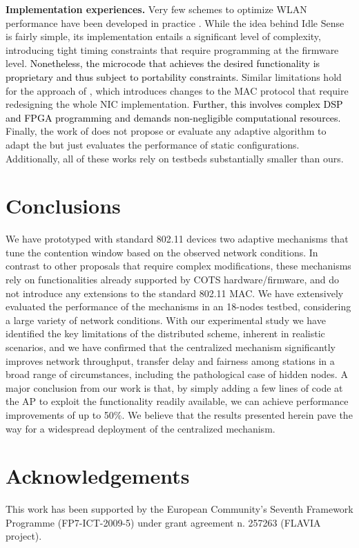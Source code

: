 \documentclass[a4paper,10pt]{article}
\newcommand{\revs}[1]{\textcolor{black}{#1}}
\begin{document}
\vspace{0.5em}
{\bf Implementation experiences.} Very few schemes to optimize WLAN performance have been developed in practice \cite{siris06,AOBimpl,idle07}. While the idea behind Idle Sense \cite{heusse05} is fairly simple, its implementation \cite{idle07} entails a significant level of complexity, introducing tight timing constraints that require programming at the firmware level. \revs{Nonetheless, the microcode that achieves the desired functionality is proprietary and thus subject to portability constraints.} Similar limitations hold for the approach of \cite{AOBimpl}, which introduces changes to the MAC protocol that require redesigning the whole NIC implementation. \revs{Further, this involves complex DSP and FPGA programming and demands non-negligible computational resources.} Finally, the work of \cite{siris06} does not propose or evaluate any adaptive algorithm to adapt the  but just evaluates the performance of static configurations. Additionally, all of these works rely on testbeds substantially smaller than ours. 














\section{Conclusions}
\label{sec:conclusions}

We have prototyped with standard 802.11 devices two adaptive mechanisms that tune the contention window based on the observed network conditions. In contrast to other proposals that require complex modifications, these mechanisms rely on functionalities already supported by COTS hardware/firmware, and do not introduce any extensions to the standard 802.11 MAC. We have extensively evaluated the performance of the mechanisms in an 18-nodes testbed, considering a large variety of network conditions. With our experimental study we have identified the key limitations of the distributed scheme, inherent in realistic scenarios, and we have confirmed that the centralized mechanism significantly improves network throughput, transfer delay and fairness among stations in a broad range of circumstances, including the pathological case of hidden nodes. A major conclusion from our work is that, by simply adding a few lines of code at the AP to exploit the functionality readily available, we can achieve performance improvements of up to 50\%. We believe that the results presented herein pave the way for a widespread deployment of the centralized mechanism.

\section*{Acknowledgements}

This work has been supported by the European Community's Seventh Framework Programme (FP7-ICT-2009-5) under grant agreement n. 257263 (FLAVIA project). 



\end{document}
